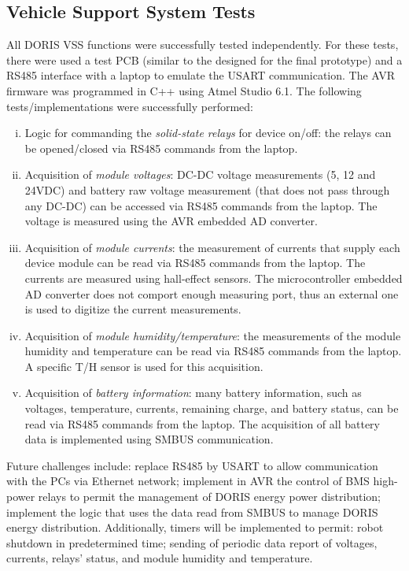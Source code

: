 \documentclass{ifacconf}
\begin{document}
\subsection{Vehicle Support System Tests}
All DORIS VSS functions were successfully tested independently. For these tests, there were used a test PCB (similar to the designed for the final prototype) and a RS485 interface with a laptop to emulate the USART communication. The AVR firmware was programmed in C++ using Atmel Studio 6.1. The following tests/implementations were successfully performed:
\begin{enumerate}[i)]
\item Logic for commanding the \emph{solid-state relays} for device on/off: the relays can be opened/closed via RS485 commands from the laptop.
\item Acquisition of \emph{module voltages}: DC-DC voltage measurements (5, 12 and 24VDC) and battery raw voltage measurement (that does not pass through any DC-DC) can be accessed via RS485 commands from the laptop. The voltage is measured using the AVR embedded AD converter.
\item Acquisition of \emph{module currents}: the measurement of currents that supply each device module can be read via RS485 commands from the laptop. The currents are measured using hall-effect sensors. The microcontroller embedded AD converter does not comport enough measuring port, thus an external one is used to digitize the current measurements.
 \item Acquisition of \emph{module humidity/temperature}: the measurements of the module humidity and temperature can be read via RS485 commands from the laptop. A specific T/H sensor is used for this acquisition.
\item Acquisition of \emph{battery information}: many battery information, such as voltages, temperature, currents, remaining charge, and battery status, can be read via RS485 commands from the laptop. The acquisition of all battery data is implemented using SMBUS communication.
\end{enumerate}
Future challenges include: replace RS485 by USART to allow communication with the PCs via Ethernet network; implement in AVR the control of BMS high-power relays to permit the management of DORIS energy power distribution; implement the logic that uses the data read from SMBUS to manage DORIS energy distribution. Additionally, timers will be implemented to permit: robot shutdown in predetermined time; sending of periodic data report of voltages, currents, relays’ status, and module humidity and temperature.
\end{document}
